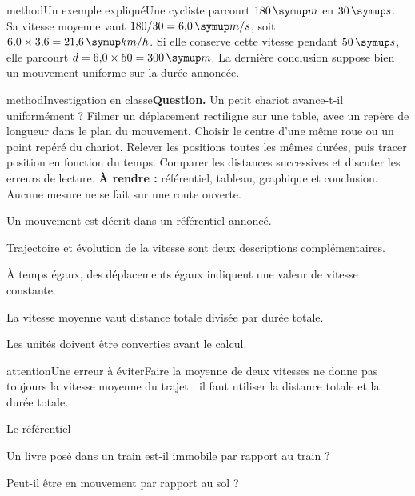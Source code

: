 \begin{pcEncadre}{method}{Un exemple expliqué}Une cycliste parcourt $180\unite m$ en $30\unite s$. Sa vitesse moyenne vaut $180/30=6{,}0\unite{m/s}$, soit $6{,}0\times3{,}6=21{,}6\unite{km/h}$. Si elle conserve cette vitesse pendant $50\unite s$, elle parcourt $d=6{,}0\times50=300\unite m$. La dernière conclusion suppose bien un mouvement uniforme sur la durée annoncée.\end{pcEncadre}
\label{activite-8}
\begin{pcEncadre}{method}{Investigation en classe}\textbf{Question.} Un petit chariot avance-t-il uniformément ? Filmer un déplacement rectiligne sur une table, avec un repère de longueur dans le plan du mouvement. Choisir le centre d’une même roue ou un point repéré du chariot. Relever les positions toutes les mêmes durées, puis tracer position en fonction du temps. Comparer les distances successives et discuter les erreurs de lecture. \textbf{À rendre :} référentiel, tableau, graphique et conclusion. Aucune mesure ne se fait sur une route ouverte.\end{pcEncadre}
\begin{questions}
\item Un mouvement est décrit dans un référentiel annoncé.
\item Trajectoire et évolution de la vitesse sont deux descriptions complémentaires.
\item À temps égaux, des déplacements égaux indiquent une valeur de vitesse constante.
\item La vitesse moyenne vaut distance totale divisée par durée totale.
\item Les unités doivent être converties avant le calcul.
\end{questions}
\begin{pcEncadre}{attention}{Une erreur à éviter}Faire la moyenne de deux vitesses ne donne pas toujours la vitesse moyenne du trajet : il faut utiliser la distance totale et la durée totale.\end{pcEncadre}
\pcGrille
\clearpage{}
\par\noindent\begin{minipage}{\linewidth}
\begin{exercice}[1]{Le référentiel}
\begin{questions}
\item Un livre posé dans un train est-il immobile par rapport au train ?
\item Peut-il être en mouvement par rapport au sol ?
\end{questions}
\end{exercice}
\end{minipage}
